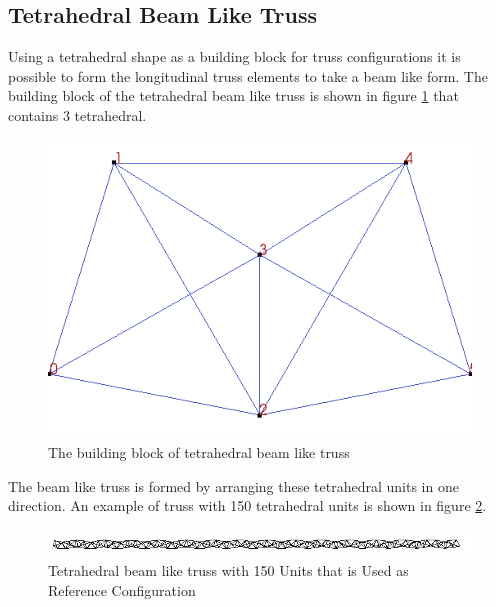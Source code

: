  
\subsection{Tetrahedral Beam Like Truss}
Using a tetrahedral shape as a building block for truss configurations it is possible to form the longitudinal truss elements to take a beam like form. The building block of the tetrahedral beam like truss is shown in figure \ref{fig:building_block_of_tetrahedral_truss} that contains 3 tetrahedral.
\begin{figure} 
\centering
\includegraphics[width=5.0in]{./chap_5_active_trusses/images_linear_tetrahedral/building_block_of_tetrahedral_truss.png}
\caption{The building block of tetrahedral beam like truss}
\label{fig:building_block_of_tetrahedral_truss}
\end{figure} 
The beam like truss is formed by arranging these tetrahedral units in one direction.
An example of truss with 150 tetrahedral units is shown in figure \ref{fig:refrence_shap_100_tetra_unit_tetrahedral_unit}. 
\begin{figure} 
\centering
\includegraphics[width=5.0in]{./chap_5_active_trusses/images_linear_tetrahedral/refrence_shap_100_tetra_unit_tetrahedral_unit.png}
\caption{Tetrahedral beam like truss with 150 Units that is Used as Reference Configuration}
\label{fig:refrence_shap_100_tetra_unit_tetrahedral_unit}
\end{figure} 

